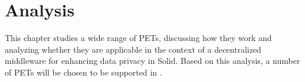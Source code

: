\chapter{Analysis}
\label{chap:analysis}
This chapter studies a wide range of \gls{PETs}, discussing how they work and analyzing whether they are applicable in the context of a decentralized middleware for enhancing data privacy in Solid. Based on this analysis, a number of \gls{PETs} will be chosen to be supported in \middleware{}. 